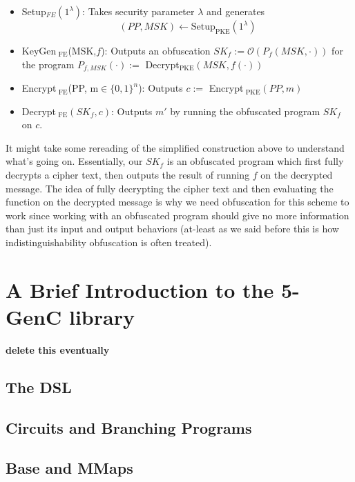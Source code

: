 \documentclass[12pt,twoside]{reedthesis}
\begin{document}
    \begin{itemize}
    \item Setup$_{ FE}(1^\lambda)$: Takes security parameter $\lambda$ and generates
     $$(PP, MSK) \leftarrow \text{Setup}_{\text{PKE}}(1^\lambda)$$
     \item KeyGen$_\text{ FE}$(MSK,$f$): Outputs an obfuscation $SK_f := \mathcal{O}(P_f(MSK, \cdot))$ for the program $P_{f,MSK}(\cdot) :=$ Decrypt$_\text{PKE}(MSK,f(\cdot))$
     \item Encrypt$_\text{ FE}$(PP, m$\in \{ 0,1 \}^n$): Outputs $c :=$ Encrypt$_\text{ PKE}(PP, m)$
     \item Decrypt$_\text{ FE}(SK_f,c)$: Outputs $m'$ by running the obfuscated program $SK_f$ on $c$.

    
    \end{itemize}
    \par It might take some rereading of the simplified construction above to understand what's going on. Essentially, our $SK_f$ is an obfuscated program which first fully decrypts a cipher text, then outputs the result of running $f$ on the decrypted message. The idea of fully decrypting the cipher text and then evaluating the function on the decrypted message is why we need obfuscation for this scheme to work since working with an obfuscated program should give no more information than just its input and output behaviors (at-least as we said before this is how indistinguishability obfuscation is often treated).
    
    
    
    
    
    \chapter{ A Brief Introduction to the 5-GenC library}
     \textbf{delete this eventually} \cite{5genc}
     
    \section{ The DSL}
    \section{Circuits and Branching Programs}
    \section{Base and MMaps}
    
\end{document}
